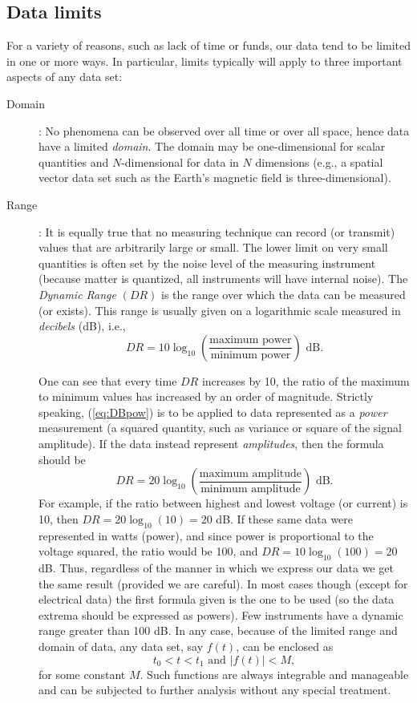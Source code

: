 \subsection{Data limits}
For a variety of reasons, such as lack of time or funds, our data tend to be limited in one or more ways.
In particular, limits typically will apply to three important aspects of any data set:
\begin{description}
\item	[Domain]: No phenomena can be observed over all time or over all space, hence data have 
a limited \emph{domain}.  The domain may be one-dimensional for scalar quantities and $N$-dimensional for
data in $N$ dimensions (e.g., a spatial vector data set such as the Earth's magnetic field is three-dimensional).
\item	[Range]: It is equally true that no measuring technique can record (or transmit) values 
that are arbitrarily large or small.  The lower limit on very small quantities is often set by 
the noise level of the measuring instrument (because matter is quantized, all instruments 
will have internal noise).  The \emph{Dynamic Range} $(DR)$ is the range over which the data can be 
measured (or exists).  This range is usually given on a logarithmic scale measured in \emph{decibels} (dB), i.e.,
\begin{equation}
		DR = 10 \log _{10} \left (\frac{\mbox{maximum power}}{\mbox{minimum power}} \right ) \mbox{ dB}.
\label{eq:DBpow}
\end{equation}

	One can see that every time $DR$ increases by 10, the ratio of the maximum to minimum 
values has increased by an order of magnitude.  Strictly speaking, (\ref{eq:DBpow}) is to be applied to data 
represented as a \emph{power} measurement (a squared quantity, such as variance or square of the 
signal amplitude).  If the data instead represent \emph{amplitudes}, then the formula should be
\begin{equation}
DR = 20 \log _{10} \left (\frac{\mbox{maximum amplitude}}{\mbox{minimum amplitude}} \right ) \mbox{ dB}.
\end{equation}
	For example, if the ratio between highest and lowest voltage (or current) is 10, then 
$DR = 20 \log_{10}(10) = 20$ dB.  If these same data were represented in watts (power), and since 
power is proportional to the voltage squared, the ratio would be 100, and $DR = 
10 \log_{10} (100) = 20$ dB.  Thus, regardless of the manner in which we express our data we 
get the same result (provided we are careful).  In most cases though (except for electrical data) the first formula given 
is the one to be used (so the data extrema should be expressed as powers). Few instruments have a dynamic range greater than 100 dB.  In any case, because of the 
limited range and domain of data, any data set, say $f(t)$, can be enclosed as
\begin{equation}
	t_0 < t < t_1 \mbox{ and } |f(t)| < M,
\end{equation}
for some constant $M$. Such functions are always integrable and manageable and can be subjected to further analysis
without any special treatment.


\end{description}
